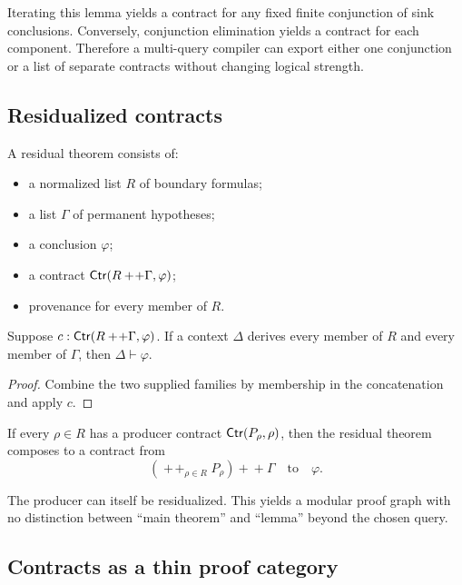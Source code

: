 Iterating this lemma yields a contract for any fixed finite conjunction of sink conclusions.  Conversely, conjunction elimination yields a contract for each component.  Therefore a multi-query compiler can export either one conjunction or a list of separate contracts without changing logical strength.

\subsection{Residualized contracts}

\begin{definition}
A residual theorem consists of:
\begin{itemize}
  \item a normalized list \(R\) of boundary formulas;
  \item a list \(\Gamma\) of permanent hypotheses;
  \item a conclusion \(\varphi\);
  \item a contract \(\mathsf{Ctr}(R+\!+\Gamma,\varphi)\);
  \item provenance for every member of \(R\).
\end{itemize}
\end{definition}

\begin{theorem}\label{thm:residual-discharge}
Suppose \(c:\mathsf{Ctr}(R+\!+\Gamma,\varphi)\).  If a context \(\Delta\) derives every member of \(R\) and every member of \(\Gamma\), then \(\Delta\vdash\varphi\).
\end{theorem}

\begin{proof}
Combine the two supplied families by membership in the concatenation and apply \(c\).
\end{proof}

\begin{corollary}
If every \(\rho\in R\) has a producer contract \(\mathsf{Ctr}(P_\rho,\rho)\), then the residual theorem composes to a contract from
\[
               \left(\mathop{+\!+}_{\rho\in R} P_\rho\right)+\!+\Gamma
               \quad\text{to}\quad\varphi.
\]
\end{corollary}

The producer can itself be residualized.  This yields a modular proof graph with no distinction between ``main theorem'' and ``lemma'' beyond the chosen query.

\subsection{Contracts as a thin proof category}

